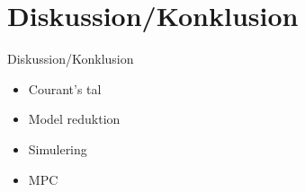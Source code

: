  \section{Diskussion/Konklusion}



\begin{frame}{Diskussion/Konklusion}{}
	\vfill \vfill\centering
	\begin{itemize}
			\item Courant's tal
			\item Model reduktion
	    	\item Simulering
	    	\item MPC
	\end{itemize}    

	\vfill \vfill
\end{frame}
